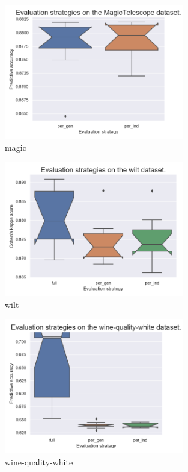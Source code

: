 \begin{figure}[ht]\centering
\includegraphics[width=0.7\textwidth]{../img/magic-out.png}
\caption{magic}
\label{pic04:magic}
\end{figure}

\begin{figure}[ht]\centering
\includegraphics[width=0.7\textwidth]{../img/wilt-out.png}
\caption{wilt}
\label{pic04:wilt}
\end{figure}

\begin{figure}[ht]\centering
\includegraphics[width=0.7\textwidth]{../img/winequality-out.png}
\caption{wine-quality-white}
\label{pic04:winequality}
\end{figure}

